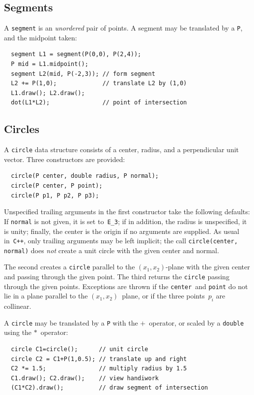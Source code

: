 \documentclass[12pt]{report}
\newcommand{\code}[1]{\texttt{#1}}
\newcommand{\CXX}{\code{C++}}
\begin{document}
\subsection*{Segments}

A \code{segment} is an \emph{unordered} pair of points. A segment may
be translated by a \code{P}, and the midpoint taken:
\begin{verbatim}
  segment L1 = segment(P(0,0), P(2,4));
  P mid = L1.midpoint();
  segment L2(mid, P(-2,3)); // form segment
  L2 += P(1,0);             // translate L2 by (1,0)
  L1.draw(); L2.draw();
  dot(L1*L2);               // point of intersection
\end{verbatim}


\subsection*{Circles}

A \code{circle} data structure consists of a center, radius, and a
perpendicular unit vector. Three constructors are provided:
\begin{verbatim}
  circle(P center, double radius, P normal);
  circle(P center, P point);
  circle(P p1, P p2, P p3);
\end{verbatim}
Unspecified trailing arguments in the first constructor take the
following defaults: If \code{normal} is not given, it is set
to~\code{E\_3}; if in addition, the radius is unspecified, it is
unity; finally, the center is the origin if no arguments are supplied.
As usual in~\CXX, only trailing arguments may be left implicit; the
call \code{circle(center, normal)} does \emph{not} create a unit circle
with the given center and normal.

The second creates a \code{circle} parallel to the $(x_1,x_2)$-plane
with the given center and passing through the given point. The third
returns the \code{circle} passing through the given points.
Exceptions are thrown if the \code{center}~and \code{point} do not lie
in a plane parallel to the $(x_1,x_2)$~plane, or if the three
points~$p_i$ are collinear.

A \code{circle} may be translated by a \code{P} with the
$+$~operator, or scaled by a \code{double} using the $*$~operator:
\begin{verbatim}
  circle C1=circle();      // unit circle
  circle C2 = C1+P(1,0.5); // translate up and right
  C2 *= 1.5;               // multiply radius by 1.5
  C1.draw(); C2.draw();    // view handiwork
  (C1*C2).draw();          // draw segment of intersection
\end{verbatim}
\end{document}
